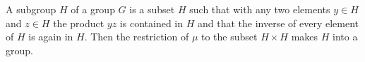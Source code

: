 A subgroup $H$ of a group $G$ is a subset $H$ such that with any two elements $y \in H$ and $z \in H$ the product $yz$ is contained in $H$ and that the inverse of every element of $H$ is again in $H$. Then the restriction of $\mu$ to the subset $H \times H$ makes $H$ into a group.
